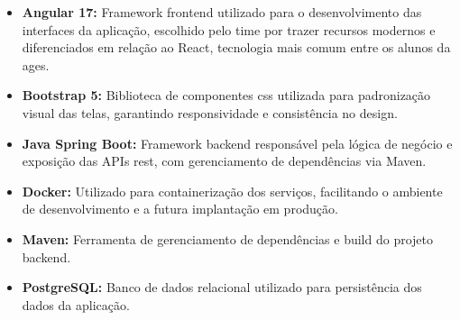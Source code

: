 \begin{itemize}
  \item \textbf{Angular 17:} Framework frontend utilizado para o desenvolvimento
    das interfaces da aplicação, escolhido pelo time por trazer recursos modernos
    e diferenciados em relação ao React, tecnologia mais comum entre os alunos da \ac{ages}.

  \item \textbf{Bootstrap 5:} Biblioteca de componentes \ac{css} utilizada para padronização
    visual das telas, garantindo responsividade e consistência no design.

  \item \textbf{Java Spring Boot:} Framework backend responsável pela lógica de negócio
    e exposição das APIs \ac{rest}, com gerenciamento de dependências via Maven.

  \item \textbf{Docker:} Utilizado para containerização dos serviços, facilitando o
    ambiente de desenvolvimento e a futura implantação em produção.

  \item \textbf{Maven:} Ferramenta de gerenciamento de dependências e build do projeto
    backend.

  \item \textbf{PostgreSQL:} Banco de dados relacional utilizado para persistência
    dos dados da aplicação.
\end{itemize}
